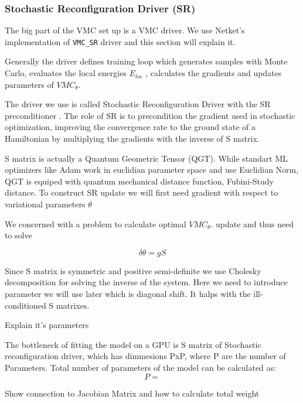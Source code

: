 \documentclass[a4paper,11pt,twoside]{article}
\begin{document}
\subsubsection{Stochastic Reconfiguration Driver (SR)}


The big part of the VMC set up is a VMC driver. We use Netket's implementation of \texttt{VMC\_SR}  driver and this section will explain it. 

Generally the driver defines training loop which generates samples with Monte Carlo, evaluates the local energies $E_{loc}$ ,  calculates the gradients and updates parameters of $VMC_\theta$. 

The driver we use is called Stochastic Reconfiguration Driver with the SR preconditioner \cite{rende_simple_2024} \cite{becca_quantum_2017}. The role of SR is to  precondition the gradient used in stochastic optimization, improving the convergence rate to the ground state of a Hamiltonian by multiplying the gradients with the inverse of S matrix. 

S matrix is actually a Quantum Geometric Tensor (QGT). While standart ML optimizers like Adam work in euclidian parameter space and use Euclidian Norm, QGT is equiped with quantum mechanical distance function, Fubini-Study distance. 
To construct SR update we will first need gradient with respect to variational parameters $\theta$ 

We concerned with a problem to calculate optimal $VMC_\theta$. update and thus need to solve 

\begin{equation}
    \delta \theta =g S 
\end{equation}



Since S matrix is symmetric and positive semi-definite we use Cholesky decomposition for solving the inverse of the system. Here we need to introduce parameter we will use later which is diagonal shift. It halps with the ill-conditioned S matrixes. 


Explain it's parameters 


The bottleneck of fitting the model on a GPU is S matrix of Stochastic reconfiguration driver, which has dimmesions PxP, where P are the number of Parameters. 
Total number of parameters of the model can be calculated as: 
\begin{equation}
    P = 
\end{equation}

Show connection to Jacobian Matrix and how to calculate total weight
\end{document}
